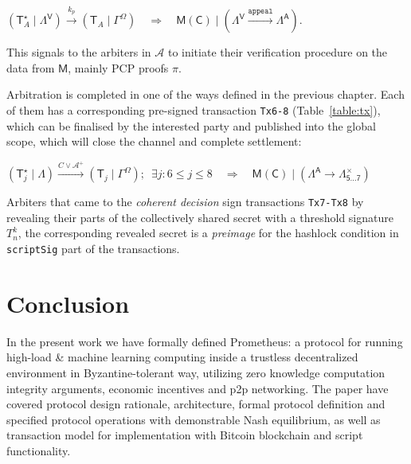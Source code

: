 \documentclass[a4paper]{article}
\begin{document}
$(\mathsf{T}^\star_A\mid\Lambda^\mathsf{V}) \xrightarrow{k_p} (\mathsf{T}_A\mid\Gamma^\Omega) \quad \Longrightarrow \quad\mathsf{M}(\mathsf{C}) \mid (\Lambda^{\mathsf{V}} \xrightarrow{\mathtt{appeal}} \Lambda^{\mathsf{A}})$.

This signals to the arbiters in $\mathcal{A}$ to initiate their verification procedure on the data from $\mathsf{M}$, mainly PCP proofs $\pi$.

Arbitration is completed in one of the ways defined in the previous chapter. Each of them has a corresponding pre-signed transaction \texttt{Tx6-8} (Table~\ref{table:tx}), which can be finalised by the interested party and published into the global scope, which will close the channel and complete settlement:

$(\mathsf{T}^\star_j\mid\Lambda) \xrightarrow{C \vee \mathcal{A}^+} (\mathsf{T}_j \mid \Gamma^\Omega);\enspace \exists j: 6 \le j \le 8\quad \Longrightarrow \quad \mathsf{M}(\mathsf{C}) \mid (\Lambda^{\mathsf{A}} \rightarrow \Lambda^\times_{\mathsf{5\dots7}})$

Arbiters that came to the \textit{coherent decision} sign transactions \texttt{Tx7-Tx8} by revealing their parts of the collectively shared secret with a threshold signature $T^k_n$, the corresponding revealed secret is a \textit{preimage} for the hashlock condition in \texttt{scriptSig} part of the transactions.

\section{Conclusion}

In the present work we have formally defined Prometheus: a protocol for running high-load \& machine learning computing inside a trustless decentralized environment in Byzantine-tolerant way, utilizing zero knowledge  computation integrity arguments, economic incentives and p2p networking. The paper have covered protocol design rationale, architecture, formal protocol definition and specified protocol operations with demonstrable Nash equilibrium, as well as transaction model for implementation with Bitcoin blockchain and script functionality.

\nocite{*}


\end{document}
